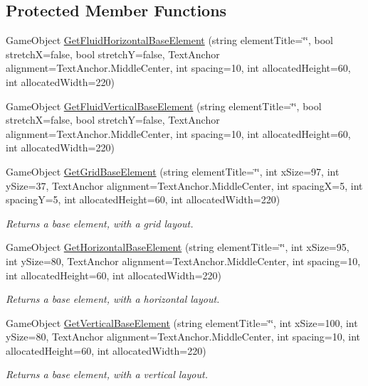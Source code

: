 \subsection*{Protected Member Functions}
\begin{DoxyCompactItemize}
\item 
Game\+Object \hyperlink{class_base_u_i_element_a4d35178a8b799757bcec7bb3c22ec92d}{Get\+Fluid\+Horizontal\+Base\+Element} (string element\+Title=\char`\"{}\char`\"{}, bool stretchX=false, bool stretchY=false, Text\+Anchor alignment=Text\+Anchor.\+Middle\+Center, int spacing=10, int allocated\+Height=60, int allocated\+Width=220)
\item 
Game\+Object \hyperlink{class_base_u_i_element_a8080c783c4cf125ffd73abc41b701847}{Get\+Fluid\+Vertical\+Base\+Element} (string element\+Title=\char`\"{}\char`\"{}, bool stretchX=false, bool stretchY=false, Text\+Anchor alignment=Text\+Anchor.\+Middle\+Center, int spacing=10, int allocated\+Height=60, int allocated\+Width=220)
\item 
Game\+Object \hyperlink{class_base_u_i_element_a54c09af57514cd421eee80888928a8c3}{Get\+Grid\+Base\+Element} (string element\+Title=\char`\"{}\char`\"{}, int x\+Size=97, int y\+Size=37, Text\+Anchor alignment=Text\+Anchor.\+Middle\+Center, int spacingX=5, int spacingY=5, int allocated\+Height=60, int allocated\+Width=220)
\begin{DoxyCompactList}\small\item\em Returns a base element, with a grid layout. \end{DoxyCompactList}\item 
Game\+Object \hyperlink{class_base_u_i_element_a27784f8eb56ae3c0062395069052e7cc}{Get\+Horizontal\+Base\+Element} (string element\+Title=\char`\"{}\char`\"{}, int x\+Size=95, int y\+Size=80, Text\+Anchor alignment=Text\+Anchor.\+Middle\+Center, int spacing=10, int allocated\+Height=60, int allocated\+Width=220)
\begin{DoxyCompactList}\small\item\em Returns a base element, with a horizontal layout. \end{DoxyCompactList}\item 
Game\+Object \hyperlink{class_base_u_i_element_a1f779d297d7c6ce4253979c263980702}{Get\+Vertical\+Base\+Element} (string element\+Title=\char`\"{}\char`\"{}, int x\+Size=100, int y\+Size=80, Text\+Anchor alignment=Text\+Anchor.\+Middle\+Center, int spacing=10, int allocated\+Height=60, int allocated\+Width=220)
\begin{DoxyCompactList}\small\item\em Returns a base element, with a vertical layout. \end{DoxyCompactList}\item 

\end{DoxyCompactItemize}
